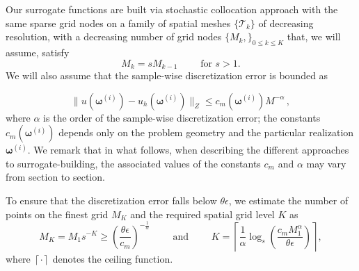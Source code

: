 \documentclass[final,3p,times,11pt]{elsarticle}
\begin{document}



Our surrogate functions are built via stochastic collocation approach with the same sparse grid nodes on a family of spatial meshes $\{\mathcal{T}_k\}$ of decreasing resolution, with a decreasing number of grid nodes $\{M_k,\}_{0\le k \le K}$ that, we will assume, satisfy
%
\begin{equation}
\label{eq:MeshGrowth}
M_k = s M_{k-1} \qquad \text{ for } s>1.
\end{equation}
%
We will also assume that the sample-wise discretization error is bounded as

\vspace{.1cm}
\begin{subequations}
\label{eq:Assumption_uh}
\begin{equation} \label{eq:Assumption_uhA}
\|u(\boldsymbol\omega^{(i)})-u_h(\boldsymbol\omega^{(i)})\|_Z\leq c_m(\boldsymbol\omega^{(i)})M^{-\alpha}\,,
\end{equation}
\end{subequations}
where $\alpha$ is the order of the sample-wise discretization error; the constants $c_m(\boldsymbol\omega^{(i)})$ depends only on the problem geometry and the particular realization $\boldsymbol\omega^{(i)}$. We remark that in what follows, when describing the different approaches to surrogate-building, the associated values of the constants $c_m$ and $\alpha$ may vary from section to section.


To ensure that the discretization error falls below $\theta\epsilon$, we estimate the number of points on the finest grid $M_K$ and the required spatial grid level $K$ as 
%
\begin{equation}
    \label{eq:SLSGC_MLS_SpatialGridsNo}
    M_K = M_1s^{-K} \ge \left(\frac{\theta\epsilon}{c_m}\right)^{-\frac 1 {\alpha}} \qquad \text{ and } \qquad     K = \left\lceil \frac{1}{\alpha}\log_s \left(\frac{c_m M_1^\alpha}{\theta\epsilon}\right) \right\rceil,
\end{equation}
%
where $\left\lceil\cdot\right\rceil$ denotes the ceiling function.
\end{document}
